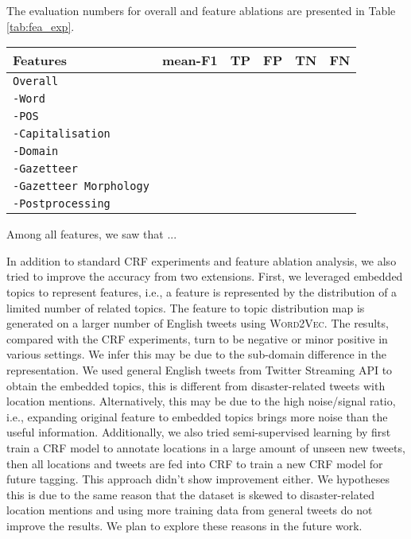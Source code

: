 \documentclass[11pt]{article}
\newcommand{\ie}{i.e.,\xspace}
\newcommand{\wordvec}{\textsc{Word2Vec}\xspace}
\newcommand{\feature}[1]{\texttt{#1}\xspace}
\newcommand{\tabref}[2][]{Table#1 \ref{#2}}
\begin{document}
The evaluation numbers for overall and feature ablations are presented in \tabref{tab:fea_exp}.
\begin{table*}[!htbp]
\begin{center}
\begin{tabular}{lccccc}
\hline 
Features                                     & mean-F1 & TP & FP & TN & FN \\ 
\hline
\feature{Overall}                            & & & & &  \\
\feature{-Word}                              & & & & &  \\
\feature{-POS}                               & & & & &  \\
\feature{-Capitalisation}                    & & & & &  \\
\feature{-Domain}                            & & & & &  \\
\feature{-Gazetteer}                         & & & & &  \\
\feature{-Gazetteer Morphology}              & & & & &  \\
\feature{-Postprocessing}                    & & & & &  \\
\hline
\end{tabular}
\end{center}
\caption{Overall experiment results and feature ablations}
\label{tab:fea_exp}
\end{table*}

Among all features, we saw that ...

In addition to standard CRF experiments and feature ablation analysis, we also tried to improve the accuracy from two extensions.
First, we leveraged embedded topics to represent features, \ie a feature is represented by the distribution of a limited number of related topics.
The feature to topic distribution map is generated on a larger number of English tweets using \wordvec.
The results, compared with the CRF experiments, turn to be negative or minor positive in various settings.
We infer this may be due to the sub-domain difference in the representation.
We used general English tweets from Twitter Streaming API to obtain the embedded topics, this is different from disaster-related tweets with location mentions.
Alternatively, this may be due to the high noise/signal ratio, \ie expanding original feature to embedded topics brings more noise than the useful information.
Additionally, we also tried semi-supervised learning by first train a CRF model to annotate locations in a large amount of unseen new tweets, then all locations and tweets are fed into CRF to train a new CRF model for future tagging.
This approach didn't show improvement either.
We hypotheses this is due to the same reason that the dataset is skewed to disaster-related location mentions and using more training data from general tweets do not improve the results.
We plan to explore these reasons in the future work.
\end{document}
